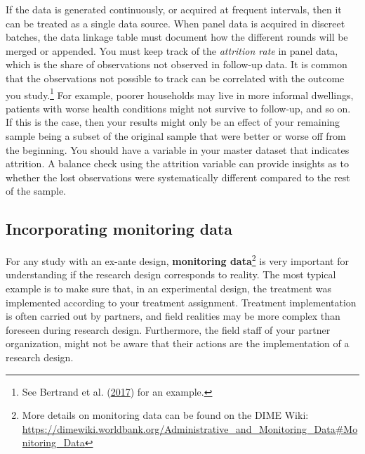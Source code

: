 \documentclass[
]{book}
\begin{document}
If the data is generated continuously,
or acquired at frequent intervals,
then it can be treated as a single data source.
When panel data is acquired in discreet batches,
the data linkage table must document
how the different rounds will be merged or appended.
You must keep track of the \emph{attrition rate} in panel data,
which is the share of observations not observed in follow-up data.
It is common that the observations not possible to track
can be correlated with the outcome you study.\footnote{See Bertrand et al. (\protect\hyperlink{ref-bertrand2017contemporaneous}{2017}) for an example.}
For example, poorer households may live in more informal dwellings,
patients with worse health conditions might not survive to follow-up,
and so on.
If this is the case,
then your results might only be an effect of your remaining sample
being a subset of the original sample
that were better or worse off from the beginning.
You should have a variable in your master dataset
that indicates attrition.
A balance check using the attrition variable
can provide insights as to whether the lost observations
were systematically different
compared to the rest of the sample.

\hypertarget{incorporating-monitoring-data}{%
\subsection*{Incorporating monitoring data}\label{incorporating-monitoring-data}}

For any study with an ex-ante design,
\textbf{monitoring data}\footnote{More details on monitoring data can be found on the DIME Wiki:
  \url{https://dimewiki.worldbank.org/Administrative_and_Monitoring_Data\#Monitoring_Data}}
is very important for understanding if the
research design corresponds to reality.
The most typical example is to make sure that,
in an experimental design,
the treatment was implemented according to your treatment assignment.
Treatment implementation is often carried out by partners,
and field realities may be more complex than foreseen during research design.
Furthermore, the field staff of your partner organization,
might not be aware that their actions are the implementation of a research design.
\end{document}
